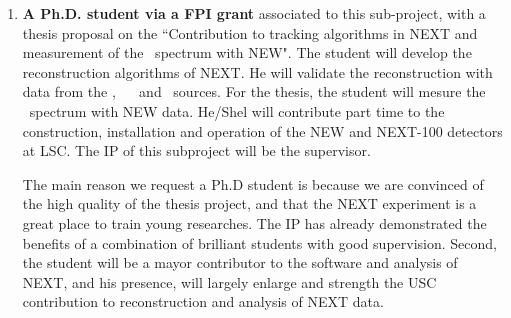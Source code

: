 \begin{enumerate}
\item {\bf A Ph.D. student via a FPI grant} associated to this sub-project, with a thesis proposal on the ``Contribution to tracking algorithms in NEXT and measurement of the \bb ~spectrum with NEW".
The student will develop the reconstruction algorithms of NEXT. He will validate the reconstruction with data from the \NA, ~\CS~ and \Tl ~sources. For the thesis, the student will mesure the \bb ~spectrum with NEW data.
He/Shel will contribute part time to the construction, installation and operation of the NEW and NEXT-100 detectors at LSC. The IP of this subproject will be the supervisor.

The main reason we request a Ph.D student is because we are convinced of the high quality of the thesis project, and 
that the NEXT experiment is a great place to train young researches. The IP has already demonstrated the benefits of a combination of brilliant students with good supervision. Second, the student will be a mayor contributor to the software and analysis of NEXT, and his presence, will largely enlarge and strength the USC contribution to reconstruction and analysis of NEXT data.






\end{enumerate}

